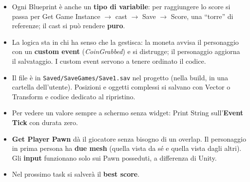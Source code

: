 \begin{itemize}
        chiamato da un custom event \textbf{SaveGame} nella Game Instance,
        raggiungibile da ovunque. Le varianti \textbf{async} non bloccano il
        gioco (l'icona che lampeggia) e segnalano la fine con
        \emph{Completed}.
  \item Ogni Blueprint è anche un \textbf{tipo di variabile}: per raggiungere lo
        score si passa per Get Game Instance $\rightarrow$ cast $\rightarrow$
        Save $\rightarrow$ Score, una ``torre'' di referenze; il cast si può
        rendere \textbf{puro}.
  \item La logica sta in chi ha senso che la gestisca: la moneta avvisa il
        personaggio con un \textbf{custom event} (\emph{CoinGrabbed}) e si
        distrugge; il personaggio aggiorna il salvataggio. I custom event
        servono a tenere ordinato il codice.
  \item Il file è in \texttt{Saved/SaveGames/Save1.sav} nel progetto (nella
        build, in una cartella dell'utente). Posizioni e oggetti complessi si
        salvano con Vector o Transform e codice dedicato al ripristino.
  \item Per vedere un valore sempre a schermo senza widget: Print String
        sull'\textbf{Event Tick} con durata zero.
  \item \textbf{Get Player Pawn} dà il giocatore senza bisogno di un overlap. Il
        personaggio in prima persona ha \textbf{due mesh} (quella vista da sé e
        quella vista dagli altri). Gli \textbf{input} funzionano solo sui Pawn
        posseduti, a differenza di Unity.
  \item Nel prossimo task si salverà il \textbf{best score}.
\end{itemize}
